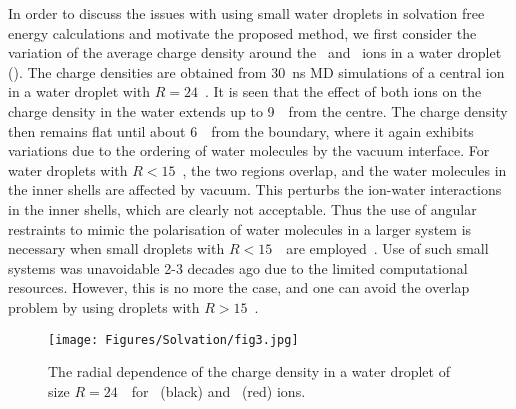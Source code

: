 In order to discuss the issues with using small water droplets in solvation free energy calculations 
and motivate the proposed method, we first consider the variation of the average charge density around 
the \Na\ and \Cl\ ions in a water droplet (). The charge densities are obtained 
from 30~ns MD simulations of a central ion in a water droplet with $R=24$~\angs. It is seen that the 
effect of both ions on the charge density in the water extends up to 9~\angs\ from the centre. The charge 
density then remains flat until about 6~\angs\ from the boundary, where it again exhibits variations due 
to the ordering of water molecules by the vacuum interface. For water droplets with $R<15$~\angs, the two 
regions overlap, and the water molecules in the inner shells are affected by vacuum. This perturbs the 
ion-water interactions in the inner shells, which are clearly not acceptable. Thus the use of angular 
restraints to mimic the polarisation of water molecules in a larger system is necessary when small 
droplets with $R<15$~\angs\ are employed~\cite{King1989}. Use of such small systems was unavoidable 2-3 
decades ago due to the limited computational resources. However, this is no more the case, and one can 
avoid the overlap problem by using droplets with $R>15$~\angs.

\begin{figure}[b!]
\centering
\texttt{[image: Figures/Solvation/fig3.jpg]}
\caption{The radial dependence of the charge density in a water droplet of size $R=24$~\angs\ 
for \Na\ (black) and \Cl\ (red) ions. }
\label{solv:fig3}
\end{figure}

